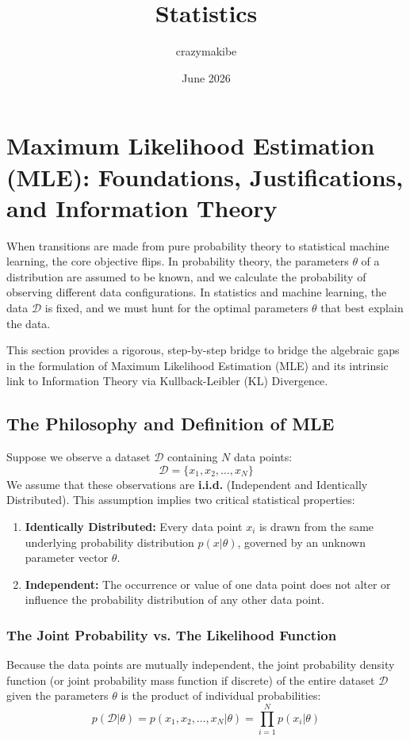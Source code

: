 \documentclass{article}
\title{Statistics}
\author{crazymakibe}
\date{June 2026}
\begin{document}
\section{Maximum Likelihood Estimation (MLE): Foundations, Justifications, and Information Theory}

When transitions are made from pure probability theory to statistical machine learning, the core objective flips. In probability theory, the parameters $\theta$ of a distribution are assumed to be known, and we calculate the probability of observing different data configurations. In statistics and machine learning, the data $\mathcal{D}$ is fixed, and we must hunt for the optimal parameters $\theta$ that best explain the data.

This section provides a rigorous, step-by-step bridge to bridge the algebraic gaps in the formulation of Maximum Likelihood Estimation (MLE) and its intrinsic link to Information Theory via Kullback-Leibler (KL) Divergence.



\subsection{The Philosophy and Definition of MLE}

Suppose we observe a dataset $\mathcal{D}$ containing $N$ data points:
\begin{equation}
\mathcal{D} = \{x_1, x_2, \dots, x_N\}
\end{equation}
We assume that these observations are \textbf{i.i.d.} (Independent and Identically Distributed). This assumption implies two critical statistical properties:
\begin{enumerate}
    \item \textbf{Identically Distributed:} Every data point $x_i$ is drawn from the same underlying probability distribution $p(x|\theta)$, governed by an unknown parameter vector $\theta$.
    \item \textbf{Independent:} The occurrence or value of one data point does not alter or influence the probability distribution of any other data point.
\end{enumerate}

\subsubsection{The Joint Probability vs. The Likelihood Function}
Because the data points are mutually independent, the joint probability density function (or joint probability mass function if discrete) of the entire dataset $\mathcal{D}$ given the parameters $\theta$ is the product of individual probabilities:
\begin{equation}
p(\mathcal{D}|\theta) = p(x_1, x_2, \dots, x_N | \theta) = \prod_{i=1}^N p(x_i|\theta)
\end{equation}
\end{document}

